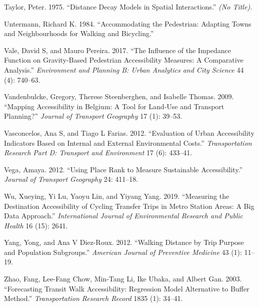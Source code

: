 \documentclass[preprint, 3p,
authoryear]{elsarticle} %
\newlength{\cslhangindent}
\newenvironment{CSLReferences}[2] %
 {\begin{list}{}{%
  \setlength{\itemindent}{0pt}
  \setlength{\leftmargin}{0pt}
  \setlength{\parsep}{0pt}
  \ifodd #1
   \setlength{\leftmargin}{\cslhangindent}
   \setlength{\itemindent}{-1\cslhangindent}
  \fi
  \setlength{\itemsep}{#2\baselineskip}}}
 {\end{list}}
\begin{document}
\begin{CSLReferences}{1}{0}
Taylor, Peter. 1975. {``Distance Decay Models in Spatial
Interactions.''} \emph{(No Title)}.

Untermann, Richard K. 1984. {``Accommodating the Pedestrian: Adapting
Towns and Neighbourhoods for Walking and Bicycling.''}

Vale, David S, and Mauro Pereira. 2017. {``The Influence of the
Impedance Function on Gravity-Based Pedestrian Accessibility Measures: A
Comparative Analysis.''} \emph{Environment and Planning B: Urban
Analytics and City Science} 44 (4): 740--63.

Vandenbulcke, Gregory, Therese Steenberghen, and Isabelle Thomas. 2009.
{``Mapping Accessibility in Belgium: A Tool for Land-Use and Transport
Planning?''} \emph{Journal of Transport Geography} 17 (1): 39--53.

Vasconcelos, Ana S, and Tiago L Farias. 2012. {``Evaluation of Urban
Accessibility Indicators Based on Internal and External Environmental
Costs.''} \emph{Transportation Research Part D: Transport and
Environment} 17 (6): 433--41.

Vega, Amaya. 2012. {``Using Place Rank to Measure Sustainable
Accessibility.''} \emph{Journal of Transport Geography} 24: 411--18.

Wu, Xueying, Yi Lu, Yaoyu Lin, and Yiyang Yang. 2019. {``Measuring the
Destination Accessibility of Cycling Transfer Trips in Metro Station
Areas: A Big Data Approach.''} \emph{International Journal of
Environmental Research and Public Health} 16 (15): 2641.

Yang, Yong, and Ana V Diez-Roux. 2012. {``Walking Distance by Trip
Purpose and Population Subgroups.''} \emph{American Journal of
Preventive Medicine} 43 (1): 11--19.

Zhao, Fang, Lee-Fang Chow, Min-Tang Li, Ike Ubaka, and Albert Gan. 2003.
{``Forecasting Transit Walk Accessibility: Regression Model Alternative
to Buffer Method.''} \emph{Transportation Research Record} 1835 (1):
34--41.

\end{CSLReferences}
\end{document}
